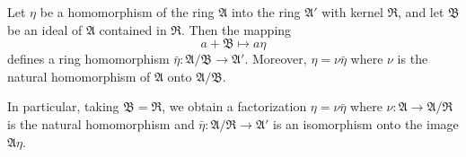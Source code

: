Let $\eta$ be a homomorphism of the ring $\mathfrak{A}$ into the ring $\mathfrak{A}'$ with kernel $\mathfrak{R}$, and let $\mathfrak{B}$ be an ideal of $\mathfrak{A}$ contained in $\mathfrak{R}$. Then the mapping
$$a + \mathfrak{B} \mapsto a\eta$$
defines a ring homomorphism $\bar{\eta}: \mathfrak{A}/\mathfrak{B} \to \mathfrak{A}'$. Moreover, $\eta = \nu \bar{\eta}$ where $\nu$ is the natural homomorphism of $\mathfrak{A}$ onto $\mathfrak{A}/\mathfrak{B}$.

In particular, taking $\mathfrak{B} = \mathfrak{R}$, we obtain a factorization $\eta = \nu \bar{\eta}$ where $\nu: \mathfrak{A} \to \mathfrak{A}/\mathfrak{R}$ is the natural homomorphism and $\bar{\eta}: \mathfrak{A}/\mathfrak{R} \to \mathfrak{A}'$ is an isomorphism onto the image $\mathfrak{A}\eta$.
